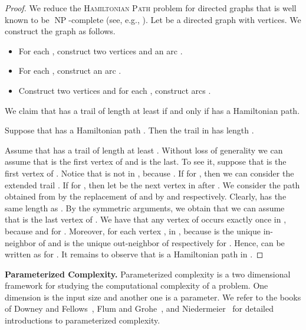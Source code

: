 \documentclass[11pt]{article}
\DeclareMathOperator{\operatorClassNP}{NP}
\newcommand{\classNP}{\ensuremath{\operatorClassNP}}
\begin{document}
\begin{proof}
We reduce the \textsc{Hamiltonian Path} problem for directed graphs that is well known to be \classNP-complete (see, e.g., \cite{GareyJ79}). Let  be a directed graph with  vertices. We construct the graph  as follows.
\begin{itemize}
\item For each , construct two vertices  and an arc .
\item For each , construct an arc .
\item Construct two vertices  and for each , construct arcs . 
\end{itemize}
We claim that  has a trail of length at least  if and only if  has a Hamiltonian path.

Suppose that  has a Hamiltonian path . Then the trail  in  has length .

Assume that  has a trail  of 
length at least . Without loss of generality we can assume that  is the first vertex of  and  is the last. To see it, suppose that  is the first vertex of . Notice that 
 is not in , because . If  for , then  we can consider the extended trail . If   for , then let  be the next vertex in  after . We consider the path  obtained from  by the replacement of  and  by  and  respectively. Clearly,  has the same length as . By the symmetric arguments, we obtain that we can assume that  is the last vertex of . We have that any vertex of  occurs exactly once in , because
 and  for .    
Moreover,  for each vertex ,  in , because  is the unique in-neighbor of  and  is the unique out-neighbor of  respectively for . Hence,  can be written as  for . It remains to observe that  is a Hamiltonian path in .
\end{proof}



\smallskip
\noindent
{\bf Parameterized Complexity.}
Parameterized complexity is a two dimensional framework
for studying the computational complexity of a problem. One dimension is the input size
and another one is a parameter. We refer to the books of Downey and Fellows~\cite{DowneyF13},
Flum and Grohe~\cite{FlumG06}, and   Niedermeier~\cite{Niedermeierbook06} for  detailed introductions  to parameterized complexity. 
\end{document}
